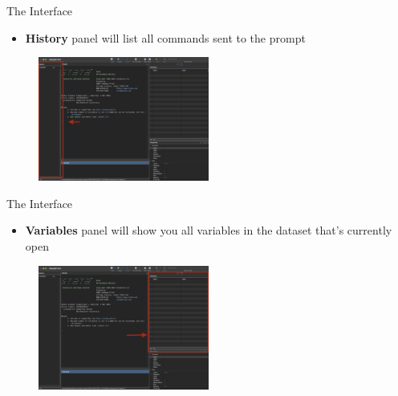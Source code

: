 \documentclass[11pt,notes=hide,aspectratio=169,mathserif]{beamer}
\begin{document}
\begin{frame}{The Interface}
    \begin{itemize}
        \item \textbf{History} panel will list all commands sent to the prompt
        \end{itemize}
    \begin{figure}
        \centering
        \includegraphics[width=0.5\textwidth]{inputs/ta1_result_window4.png}
    \end{figure}
\end{frame}

\begin{frame}{The Interface}
    \begin{itemize}
        \item \textbf{Variables} panel will show you all variables in the dataset that's currently open
    \end{itemize}
    \begin{figure}
        \centering
        \includegraphics[width=0.5\textwidth]{inputs/ta1_result_window5.png}
    \end{figure}
\end{frame}
\end{document}
